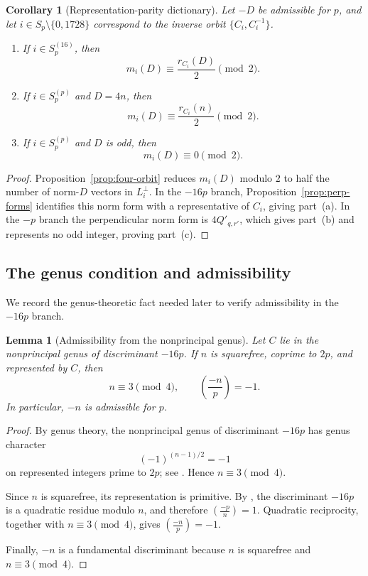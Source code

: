 \documentclass[10pt,a4paper]{amsart}
\newtheorem{lemma}[theorem]{Lemma}
\newtheorem{corollary}[theorem]{Corollary}
\newcommand{\leg}[2]{\left(\frac{#1}{#2}\right)}
\begin{document}
\begin{corollary}[Representation-parity dictionary]
\label{cor:dictionary}
Let $-D$ be admissible for $p$, and let
$i\in S_p\setminus\{0,1728\}$ correspond to the inverse orbit
$\{C_i,C_i^{-1}\}$.
\begin{enumerate}[label=\textup{(\alph*)}]
\item If $i\in S_p^{(16)}$, then
\[
  m_i(D)\equiv\frac{r_{C_i}(D)}2\pmod2.
\]

\item If $i\in S_p^{(p)}$ and $D=4n$, then
\[
  m_i(D)\equiv\frac{r_{C_i}(n)}2\pmod2.
\]

\item If $i\in S_p^{(p)}$ and $D$ is odd, then
\[
  m_i(D)\equiv0\pmod2.
\]
\end{enumerate}
\end{corollary}

\begin{proof}
Proposition~\ref{prop:four-orbit} reduces $m_i(D)$ modulo $2$ to half
the number of norm-$D$ vectors in $L_i^\perp$. In the $-16p$ branch,
Proposition~\ref{prop:perp-forms} identifies this norm form with a
representative of $C_i$, giving part~\textup{(a)}. In the $-p$ branch
the perpendicular norm form is $4Q'_{q,r'}$, which gives
part~\textup{(b)} and represents no odd integer, proving
part~\textup{(c)}.
\end{proof}


\subsection{The genus condition and admissibility}

We record the genus-theoretic fact needed later to verify admissibility in
the $-16p$ branch.

\begin{lemma}[Admissibility from the nonprincipal genus]
\label{lem:odd-genus}
Let $C$ lie in the nonprincipal genus of discriminant $-16p$. If $n$ is
squarefree, coprime to $2p$, and represented by $C$, then
\[
  n\equiv3\pmod4,
  \qquad
  \leg{-n}{p}=-1.
\]
In particular, $-n$ is admissible for $p$.
\end{lemma}

\begin{proof}
By genus theory, the nonprincipal genus of discriminant $-16p$ has genus
character
\[
  (-1)^{(n-1)/2}=-1
\]
on represented integers prime to $2p$; see
\cite[Theorem~3.15]{Cox2013}. Hence $n\equiv3\pmod4$.

Since $n$ is squarefree, its representation is primitive. By
\cite[Lemma~2.5]{Cox2013}, the discriminant $-16p$ is a quadratic residue
modulo $n$, and therefore
$\leg{-p}{n}=1$.
Quadratic reciprocity, together with $n\equiv3\pmod4$, gives
$\leg{-n}{p}=-1$.

Finally, $-n$ is a fundamental discriminant because $n$ is squarefree and
$n\equiv3\pmod4$.
\end{proof}
\end{document}

